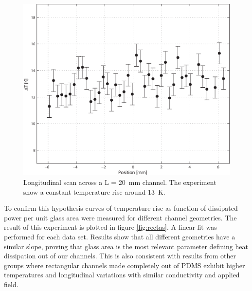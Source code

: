\documentclass[twocolumn]{svjour3}       %
\begin{document}
\begin{figure}[h!]
\centering
\includegraphics[width=\columnwidth]{figs/long.eps}
\caption{Longitudinal scan across a L = 20~mm channel. The experiment show a constant temperature rise around 13~K.\label{fig:long}}
\end{figure}

To confirm this hypothesis curves of temperature rise as function of dissipated power per unit glass area were measured for different channel geometries. The result of this experiment is plotted in figure \ref{fig:rectas}. A linear fit was performed for each data set. Results show that all different geometries have a similar slope, proving that glass area is the most relevant parameter defining heat dissipation out of our channels. This is also consistent with results from other groups \cite{dye1} where rectangular channels made completely out of PDMS exhibit higher temperatures and longitudinal variations with similar conductivity and applied field. 
\end{document}
